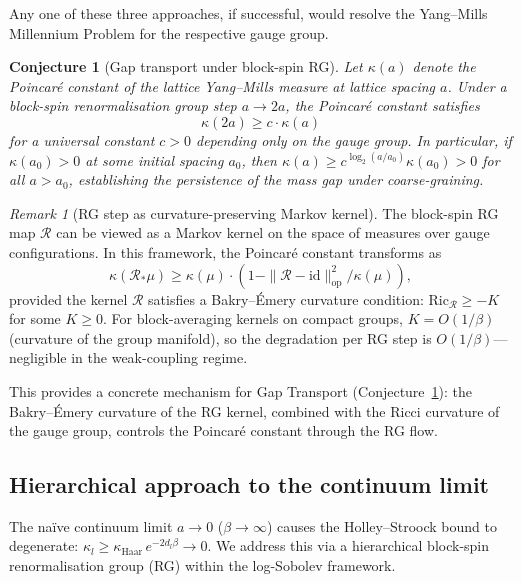 \documentclass[12pt,a4paper]{article}
\theoremstyle{definition}
\theoremstyle{plain}
\newtheorem{conjecture}[definition]{Conjecture}
\theoremstyle{remark}
\newtheorem{remark}[definition]{Remark}
\begin{document}
Any one of these three approaches, if successful, would resolve the
Yang--Mills Millennium Problem for the respective gauge group.

\begin{conjecture}[Gap transport under block-spin RG]
\label{conj:gap-transport}
Let $\kappa(a)$ denote the Poincar\'e constant of the lattice Yang--Mills measure at lattice spacing $a$. Under a block-spin renormalisation group step $a \to 2a$, the Poincar\'e constant satisfies
\[
\kappa(2a) \geq c \cdot \kappa(a)
\]
for a universal constant $c > 0$ depending only on the gauge group. In particular, if $\kappa(a_0) > 0$ at some initial spacing $a_0$, then $\kappa(a) \geq c^{\log_2(a/a_0)} \kappa(a_0) > 0$ for all $a > a_0$, establishing the persistence of the mass gap under coarse-graining.
\end{conjecture}

\begin{remark}[RG step as curvature-preserving Markov kernel]
\label{rem:rg-markov-kernel}
The block-spin RG map $\mathcal{R}$ can be viewed as a Markov kernel on the space of measures over gauge configurations. In this framework, the Poincar\'e constant transforms as
\[
\kappa(\mathcal{R}_* \mu) \geq \kappa(\mu) \cdot \left(1 - \|\mathcal{R} - \mathrm{id}\|_{\mathrm{op}}^2 / \kappa(\mu) \right),
\]
provided the kernel $\mathcal{R}$ satisfies a Bakry--\'Emery curvature condition: $\mathrm{Ric}_{\mathcal{R}} \geq -K$ for some $K \geq 0$. For block-averaging kernels on compact groups, $K = O(1/\beta)$ (curvature of the group manifold), so the degradation per RG step is $O(1/\beta)$---negligible in the weak-coupling regime.

This provides a concrete mechanism for Gap Transport (Conjecture~\ref{conj:gap-transport}): the Bakry--\'Emery curvature of the RG kernel, combined with the Ricci curvature of the gauge group, controls the Poincar\'e constant through the RG flow.
\end{remark}

\subsection{Hierarchical approach to the continuum limit}
\label{sec:hierarchical-continuum}

The na\"ive continuum limit $a \to 0$ ($\beta \to \infty$) causes the Holley--Stroock bound to degenerate: $\kappa_l \geq \kappa_{\mathrm{Haar}}\, e^{-2d_l\beta} \to 0$. We address this via a hierarchical block-spin renormalisation group (RG) within the log-Sobolev framework.
\end{document}
